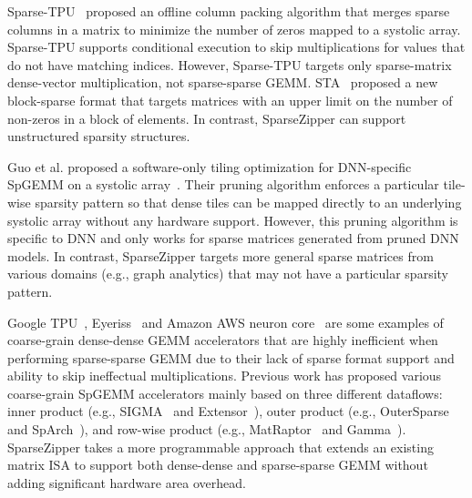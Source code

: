 Sparse-TPU~\cite{he-sparse-tpu-ics2020} proposed an offline column packing
algorithm that merges sparse columns in a matrix to minimize the number of
zeros mapped to a systolic array.
Sparse-TPU supports conditional execution to skip multiplications for values
that do not have matching indices.
However, Sparse-TPU targets only sparse-matrix dense-vector multiplication, not
sparse-sparse GEMM.
STA~\cite{liu-sta-cal2020} proposed a new block-sparse format that targets
matrices with an upper limit on the number of non-zeros in a block of elements.
In contrast, SparseZipper can support unstructured sparsity structures.

Guo et al. proposed a software-only tiling optimization for DNN-specific SpGEMM
on a systolic array~\cite{guo-sw-only-spgemm-sc2020}.
Their pruning algorithm enforces a particular tile-wise sparsity pattern so
that dense tiles can be mapped directly to an underlying systolic array without
any hardware support.
However, this pruning algorithm is specific to DNN and only works for sparse
matrices generated from pruned DNN models.
In contrast, SparseZipper targets more general sparse matrices from various
domains (e.g., graph analytics) that may not have a particular sparsity
pattern.

Google TPU~\cite{jouppi-datacenter-isca2017,teich-google-tpu-v2-blog2018,jouppi-google-tpu-v2-v3-cacm2020,jouppi-tpu-v4-isca2023},
Eyeriss~\cite{chen-eyeriss-isscc2016} and Amazon AWS neuron
core~\cite{aws-neuron-core-2023} are some examples of coarse-grain dense-dense
GEMM accelerators that are highly inefficient when performing sparse-sparse
GEMM due to their lack of sparse format support and ability to skip ineffectual
multiplications.
Previous work has proposed various coarse-grain SpGEMM accelerators mainly
based on three different dataflows: inner product (e.g.,
SIGMA~\cite{qin-sigma-hpca2020} and Extensor~\cite{hegde-extensor-micro2019}),
outer product (e.g., OuterSparse~\cite{pal-outerspace-hpca2018} and
SpArch~\cite{zhang-sparch-hpca2020}), and row-wise product (e.g.,
MatRaptor~\cite{srivastava-matraptor-micro2020} and
Gamma~\cite{zhang-gamma-asplos2021}).
SparseZipper takes a more programmable approach that extends an existing matrix
ISA to support both dense-dense and sparse-sparse GEMM without adding
significant hardware area overhead.

